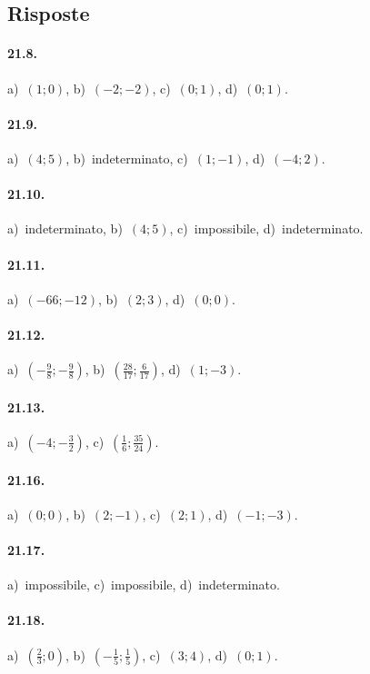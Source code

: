 \subsection{Risposte}

\paragraph{21.8.} a)~$(1;0)$, \quad b)~$(-2;-2)$, \quad c)~$(0;1)$, \quad d)~$(0;1)$.

\paragraph{21.9.} a)~$(4;5)$, \quad b)~indeterminato, \quad c)~$(1;-1)$, \quad d)~$(-4;2)$.

\paragraph{21.10.} a)~indeterminato, \quad b)~$(4;5)$, \quad c)~impossibile, \quad d)~indeterminato.

\paragraph{21.11.} a)~$(-66;-12)$, \quad b)~$(2;3)$, \quad d)~$(0;0)$.

\paragraph{21.12.} a)~$\left(-{\frac{9}{8}};-\frac{9}{8}\right)$, \quad b)~$\left(\frac{28}{17};\frac{6}{17}\right)$, \quad d)~$(1;-3)$.

\paragraph{21.13.} a)~$\left(-4;-{\frac{3}{2}}\right)$, \quad c)~$\left(\frac{1}{6};\frac{35}{24}\right)$.

\paragraph{21.16.} a)~$(0;0)$, \quad b)~$(2;-1)$, \quad c)~$(2;1)$, \quad d)~$(-1;-3)$.

\paragraph{21.17.} a)~impossibile, \quad c)~impossibile, \quad d)~indeterminato.

\paragraph{21.18.} a)~$\left(\frac{2}{3};0\right)$, \quad b)~$\left(-{\frac{1}{5}};\frac{1}{5}\right)$, \quad c)~$(3;4)$, \quad d)~$(0;1)$.

